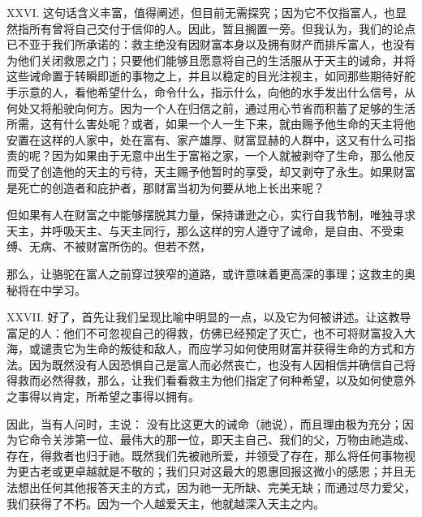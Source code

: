XXVI.   这句话含义丰富，值得阐述，但目前无需探究；因为它不仅指富人，也显然指所有曾将自己交付于信仰的人。因此，暂且搁置一旁。但我认为，我们的论点已不亚于我们所承诺的：救主绝没有因财富本身以及拥有财产而排斥富人，也没有为他们关闭救恩之门；只要他们能够且愿意将自己的生活服从于天主的诫命，并将这些诫命置于转瞬即逝的事物之上，并且以稳定的目光注视主，如同那些期待好舵手示意的人，看他希望什么，命令什么，指示什么，向他的水手发出什么信号，从何处又将船驶向何方。因为一个人在归信之前，通过用心节省而积蓄了足够的生活所需，这有什么害处呢？或者，如果一个人一生下来，就由赐予他生命的天主将他安置在这样的人家中，处在富有、家产雄厚、财富显赫的人群中，这又有什么可指责的呢？因为如果由于无意中出生于富裕之家，一个人就被剥夺了生命，那么他反而受了创造他的天主的亏待，天主赐予他暂时的享受，却又剥夺了永生。如果财富是死亡的创造者和庇护者，那财富当初为何要从地上长出来呢？\par

但如果有人在财富之中能够摆脱其力量，保持谦逊之心，实行自我节制，唯独寻求天主，并呼吸天主、与天主同行，那么这样的穷人遵守了诫命，是自由、不受束缚、无病、不被财富所伤的。但若不然， \par

那么，让骆驼在富人之前穿过狭窄的道路，或许意味着更高深的事理；这救主的奥秘将在中学习。\par

XXVII. 好了，首先让我们呈现比喻中明显的一点，以及它为何被讲述。让这教导富足的人：他们不可忽视自己的得救，仿佛已经预定了灭亡，也不可将财富投入大海，或谴责它为生命的叛徒和敌人，而应学习如何使用财富并获得生命的方式和方法。因为既然没有人因恐惧自己是富人而必然丧亡，也没有人因相信并确信自己将得救而必然得救，那么，让我们看看救主为他们指定了何种希望，以及如何使意外之事得以肯定，所希望之事得以拥有。\par

因此，当有人问时，主说：  没有比这更大的诫命（祂说），而且理由极为充分；因为它命令关涉第一位、最伟大的那一位，即天主自己、我们的父，万物由祂造成、存在，得救者也归于祂。既然我们先被祂所爱，并领受了存在，那么将任何事物视为更古老或更卓越就是不敬的；我们只对这最大的恩惠回报这微小的感恩；并且无法想出任何其他报答天主的方式，因为祂一无所缺、完美无缺；而通过尽力爱父，我们获得了不朽。因为一个人越爱天主，他就越深入天主之内。\par

